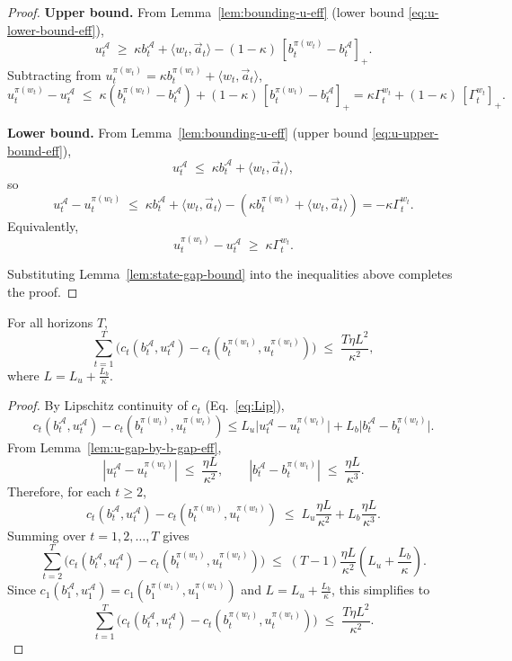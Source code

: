 \begin{proof}
\textbf{Upper bound.}  
From Lemma~\ref{lem:bounding-u-eff} (lower bound \eqref{eq:u-lower-bound-eff}),
\[
u_t^\mathcal{A}
\;\ge\;
\kappa b_t^\mathcal{A} + \langle w_t,\vec{a}_t\rangle
-(1-\kappa)\,[b_t^{\pi(w_t)}-b_t^\mathcal{A}]_+ .
\]
Subtracting from \(u_t^{\pi(w_t)} = \kappa b_t^{\pi(w_t)} + \langle w_t,\vec{a}_t\rangle\),
\[
u_t^{\pi(w_t)} - u_t^\mathcal{A}
\;\le\;
\kappa (b_t^{\pi(w_t)}-b_t^\mathcal{A})
+(1-\kappa)\,[b_t^{\pi(w_t)}-b_t^\mathcal{A}]_+
= \kappa \Gamma_t^{w_t} + (1-\kappa)\,[\Gamma_t^{w_t}]_+ .
\]

\textbf{Lower bound.}  
From Lemma~\ref{lem:bounding-u-eff} (upper bound \eqref{eq:u-upper-bound-eff}),
\[
u_t^\mathcal{A}
\;\le\;
\kappa b_t^\mathcal{A} + \langle w_t,\vec{a}_t\rangle ,
\]
so
\[
u_t^\mathcal{A} - u_t^{\pi(w_t)}
\;\le\;
\kappa b_t^\mathcal{A} + \langle w_t,\vec{a}_t\rangle
- (\kappa b_t^{\pi(w_t)} + \langle w_t,\vec{a}_t\rangle)
= -\kappa\Gamma_t^{w_t}.
\]
Equivalently,
\[
u_t^{\pi(w_t)} - u_t^\mathcal{A}
\;\ge\; \kappa \Gamma_t^{w_t}.
\]


Substituting Lemma~\ref{lem:state-gap-bound} into the inequalities above completes the proof.
\end{proof}











\begin{Thm:Lemma}
\label{lem:stab-sum}
For all horizons \(T\),
\[
\sum_{t=1}^T \Big(
c_t\!\left(b_t^\mathcal{A},u_t^\mathcal{A}\right)
-
c_t\!\left(b_t^{\pi(w_t)},u_t^{\pi(w_t)}\right)
\Big)
\;\le\;
\frac{T \eta L^2}{\kappa^2},
\]
where \(L = L_u + \tfrac{L_b}{\kappa}\).
\end{Thm:Lemma}

\begin{proof}
By Lipschitz continuity of \(c_t\) (Eq.~\eqref{eq:Lip}),
\[
c_t\!\left(b_t^\mathcal{A},u_t^\mathcal{A}\right)
-
c_t\!\left(b_t^{\pi(w_t)},u_t^{\pi(w_t)}\right) 
\le
L_u \big|u_t^\mathcal{A} - u_t^{\pi(w_t)}\big|
+ L_b \big|b_t^\mathcal{A} - b_t^{\pi(w_t)}\big|.
\]
From Lemma~\ref{lem:u-gap-by-b-gap-eff},
\[
|u_t^\mathcal{A} - u_t^{\pi(w_t)}|
\;\le\; \frac{\eta L}{\kappa^2},
\qquad
|b_t^\mathcal{A} - b_t^{\pi(w_t)}|
\;\le\; \frac{\eta L}{\kappa^3}.
\]
Therefore, for each \(t \ge 2\),
\[
c_t\!\left(b_t^\mathcal{A},u_t^\mathcal{A}\right)
-
c_t\!\left(b_t^{\pi(w_t)},u_t^{\pi(w_t)}\right)
\;\le\;
L_u \frac{\eta L}{\kappa^2}
+ L_b \frac{\eta L}{\kappa^3}.
\]
Summing over \(t=1,2,\dots,T\) gives
\[
\sum_{t=2}^T
\Big(
c_t(b_t^\mathcal{A},u_t^\mathcal{A})
-
c_t(b_t^{\pi(w_t)},u_t^{\pi(w_t)})
\Big)
\;\le\;
(T-1)\frac{\eta L}{\kappa^2}\left(
L_u 
+  \frac{L_b}{\kappa}
\right).
\]
Since 
\(c_1(b_1^\mathcal{A},u_1^\mathcal{A})
=
c_1(b_1^{\pi(w_1)},u_1^{\pi(w_1)})\) and \(L = L_u + \tfrac{L_b}{\kappa}\), this simplifies to
\[
\sum_{t=1}^T
\Big(
c_t(b_t^\mathcal{A},u_t^\mathcal{A})
-
c_t(b_t^{\pi(w_t)},u_t^{\pi(w_t)})
\Big)
\;\le\;
\frac{T \eta L^2}{\kappa^2}.
\]
\end{proof}



